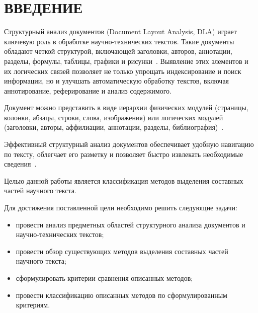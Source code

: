 \section*{ВВЕДЕНИЕ}

Структурный анализ документов (Document Layout Analysis, DLA) играет ключевую роль в обработке научно-технических текстов.
Такие документы обладают четкой структурой, включающей заголовки, авторов, аннотации, разделы, формулы, таблицы, графики и рисунки~\cite{visual-2019, dla-survey, dsaa-survey, dia-survey}.
Выявление этих элементов и их логических связей позволяет не только упрощать индексирование и поиск информации, но и улучшать автоматическую обработку текстов, включая аннотирование, реферирование и анализ содержимого.

Документ можно представить в виде иерархии физических модулей (страницы, колонки, абзацы, строки, слова, изображения) или логических модулей (заголовки, авторы, аффилиации, аннотации, разделы, библиография)~\cite{dla-book}.

Эффективный структурный анализ документов обеспечивает удобную навигацию по тексту, облегчает его разметку и позволяет быстро извлекать необходимые сведения~\cite{dla-book}.

Целью данной работы является классификация методов выделения составных частей научного текста.

Для достижения поставленной цели необходимо решить следующие задачи:
\begin{itemize}
    \item провести анализ предметных областей структурного анализа документов и научно-технических текстов;
    \item провести обзор существующих методов выделения составных частей научного текста;
    \item сформулировать критерии сравнения описанных методов;
    \item провести классификацию описанных методов по сформулированным критериям.
\end{itemize}
